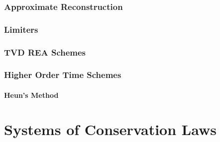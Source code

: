 \documentclass[
  fourColumns,
  landscape
]{formularyETH/formularyETH}
\begin{document}
      \subsubsection{Approximate Reconstruction}\label{subsubsec:approximate_reconstruction}
        
        \label{subsubsubsec:constraints}
        
    \subsubsection{Limiters}\label{subsubsec:limiters}
        
        \label{subsubsubsec:minmod_limiter}
          
        \label{subsubsubsec:superbee_limiter}
          
        \label{subsubsubsec:mc_limiter}
          
    \subsubsection{TVD REA Schemes}\label{subsubsec:name}
      
    \subsubsection{Higher Order Time Schemes}\label{subsubsec:higher_order_time_schemes}
      \label{subsubsubsec:semi-discrete_schemes}
      
        \paragraph{Heun's Method}\label{para:heun's_method}
        
\newpage
\section{Systems of Conservation Laws}\label{subsec:systems_of_conservation_laws}
      
\end{document}
